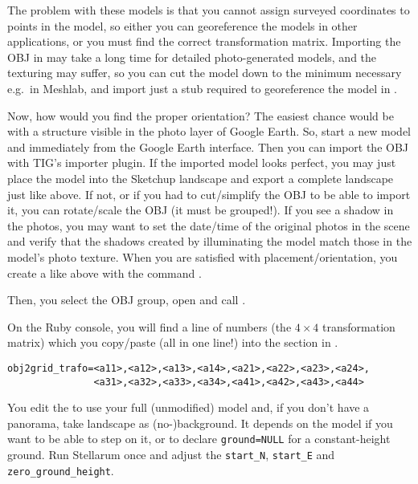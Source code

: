 The problem with these models is that you cannot assign surveyed
coordinates to points in the model, so either you can georeference the
models in other applications, or you must find the correct
transformation matrix.  Importing the OBJ in  may take a long
time for detailed photo-generated models, and the texturing may
suffer, so you can cut the model down to the minimum necessary e.g.\ in
Meshlab, and import just a stub required to georeference the model in
. 

Now, how would you find the proper orientation? The easiest chance
would be with a structure visible in the photo layer of Google
Earth. So, start a new model and immediately  from the
Google Earth interface. Then you can import the OBJ with TIG's importer
plugin.  If the imported model looks perfect, you may just place the
model into the Sketchup landscape and export a complete landscape just
like above. If not, or if you had to cut/simplify the OBJ to be able
to import it, you can rotate/scale the OBJ (it must be grouped!). If
you see a shadow in the photos, you may want to set the date/time of
the original photos in the scene and verify that the shadows created by
 illuminating the model match those in the model's photo
texture. When you are satisfied with placement/orientation, you create
a  like above with the command
.

Then, you select the OBJ group, open  and call
.

On the Ruby console, you will find a line of numbers (the $4\times4$
transformation matrix) which you copy/paste (all in one line!) into the
\file{[model]} section in .
\begin{verbatim}
obj2grid_trafo=<a11>,<a12>,<a13>,<a14>,<a21>,<a22>,<a23>,<a24>,
               <a31>,<a32>,<a33>,<a34>,<a41>,<a42>,<a43>,<a44>
\end{verbatim}
You edit the  to use your full (unmodified)
 model and, if you don't have a panorama, take 
landscape as (no-)background. It depends on the model if you want to
be able to step on it, or to declare \texttt{ground=NULL} for a
constant-height ground. Run Stellarum once and adjust the
\texttt{start\_N}, \texttt{start\_E} and \texttt{zero\_ground\_height}.


